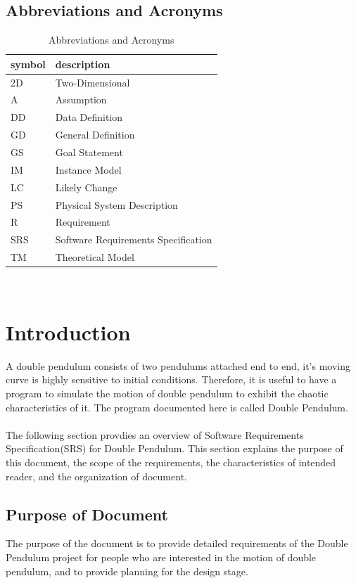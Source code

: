 \documentclass[12pt]{article}
\begin{document}
\subsection{Abbreviations and Acronyms}\label{sec_abbandacr}
\renewcommand{\arraystretch}{1.2}
\begin{table}[H]
  \centering
  \begin{tabular}{l l} 
    \toprule    
    \textbf{symbol} & \textbf{description}\\
    \midrule 
    2D & Two-Dimensional\\
    A & Assumption\\
    DD & Data Definition\\
    GD & General Definition\\
    GS & Goal Statement\\
    IM & Instance Model\\
    LC & Likely Change\\
    PS & Physical System Description\\
    R & Requirement\\
    SRS & Software Requirements Specification\\
    TM & Theoretical Model\\
    \bottomrule
  \end{tabular}\\
  \caption{Abbreviations and Acronyms}
\end{table}

\newpage
\section{Introduction}\label{sec_intro}
A double pendulum consists of two pendulums attached end to end, it's moving curve is highly sensitive to initial conditions. Therefore, it is useful to have a program to simulate the motion of double pendulum to exhibit the chaotic characteristics of it. The program documented here is called Double Pendulum.\\\\The following section provdies an overview of Software Requirements Specification(SRS) for Double Pendulum. This section explains the purpose of this document, the scope of the requirements, the characteristics of intended reader, and the organization of document. 

\subsection{Purpose of Document}\label{sec_purpose}
The purpose of the document is to provide detailed requirements of the Double Pendulum project for people who are interested in the motion of double pendulum, and to provide planning for the design stage. 
\end{document}
